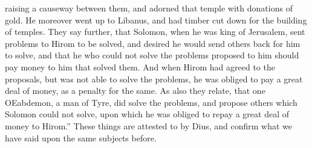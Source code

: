 raising a causeway between them, and adorned that temple with donations of
gold. He moreover went up to Libanus, and had timber cut down for the
building of temples. They say further, that Solomon, when he was king of
Jerusalem, sent problems to Hirom to be solved, and desired he would send
others back for him to solve, and that he who could not solve the problems
proposed to him should pay money to him that solved them. And when Hirom
had agreed to the proposals, but was not able to solve the problems, he
was obliged to pay a great deal of money, as a penalty for the same. As
also they relate, that one OEabdemon, a man of Tyre, did solve the
problems, and propose others which Solomon could not solve, upon which he
was obliged to repay a great deal of money to Hirom.'' These things are
attested to by Dius, and confirm what we have said upon the same subjects
before.

